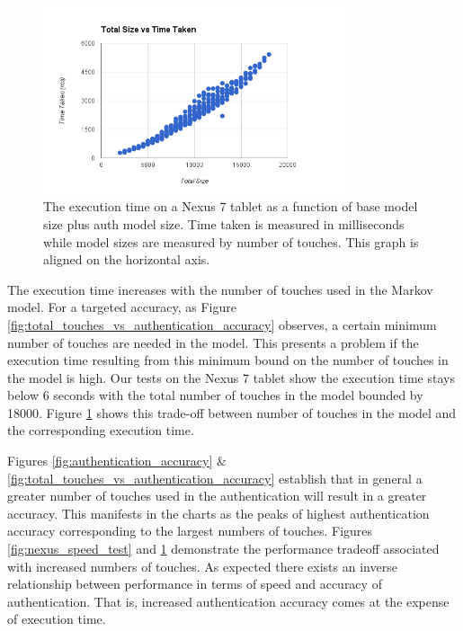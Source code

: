 \documentclass{acm_proc_article-sp}
\begin{document}
\begin{figure}
\centering
\includegraphics[width=3.5in]{nexus_total_size_time.png}
\caption{The execution time  on a Nexus 7 tablet as a function of base model size plus auth model size.
Time taken is measured in milliseconds while model sizes are measured by number of touches.
This graph is aligned on the horizontal axis.}
\label{fig:nexus_total_size_time}
\end{figure}

The execution time  increases
with the number of touches used in the Markov model.
For a targeted accuracy, as Figure \ref{fig:total_touches_vs_authentication_accuracy} observes, a certain minimum
number of touches are needed in the model.
This presents a problem if the execution time
resulting from this minimum bound on the
number of touches in the model is high. Our
tests  on the Nexus 7 tablet show the execution time
stays below 6 seconds
with the  total number of touches in the model bounded by 18000.
Figure \ref{fig:nexus_total_size_time} shows this trade-off between number of touches
in the model and the corresponding execution time.


Figures \ref{fig:authentication_accuracy}  \& \ref{fig:total_touches_vs_authentication_accuracy} establish that in general a greater number of touches used in the authentication will result in a greater accuracy. This manifests in the charts as the peaks of highest authentication accuracy  
corresponding to the largest numbers of touches. Figures \ref{fig:nexus_speed_test} and \ref{fig:nexus_total_size_time} demonstrate the performance tradeoff associated with increased numbers of touches. 
As expected there exists an inverse relationship between performance in terms of speed and accuracy of authentication. That is, increased authentication accuracy comes at the expense of execution time. 
\end{document}
